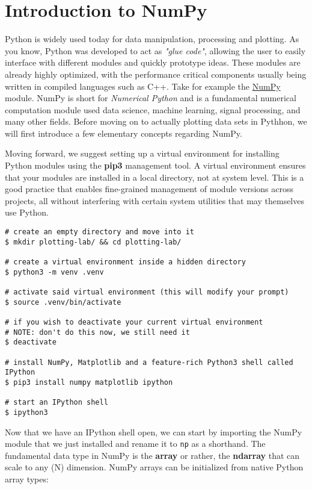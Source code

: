 \section{Introduction to NumPy}

Python is widely used today for data manipulation, processing and plotting. As
you know, Python was developed to act as \textit{"glue code"}, allowing the
user to easily interface with different modules and quickly prototype ideas.
These modules are already highly optimized, with the performance critical
components usually being written in compiled languages such as C++. Take for
example the \href{https://github.com/numpy/numpy}{NumPy} module. NumPy is
short for \textit{Numerical Python} and is a fundamental numerical computation
module used data science, machine learning, signal processing, and many other
fields. Before moving on to actually plotting data sets in Pythhon, we will
first introduce a few elementary concepts regarding NumPy.

Moving forward, we suggest setting up a virtual environment for installing
Python modules using the \textbf{pip3} management tool. A virtual environment
ensures that your modules are installed in a local directory, not at system
level. This is a good practice that enables fine-grained management of module
versions across projects, all without interfering with certain system utilities
that may themselves use Python.

\begin{lstlisting}[style=bashstyle]
# create an empty directory and move into it
$ mkdir plotting-lab/ && cd plotting-lab/

# create a virtual environment inside a hidden directory
$ python3 -m venv .venv

# activate said virtual environment (this will modify your prompt)
$ source .venv/bin/activate

# if you wish to deactivate your current virtual environment
# NOTE: don't do this now, we still need it
$ deactivate

# install NumPy, Matplotlib and a feature-rich Python3 shell called IPython
$ pip3 install numpy matplotlib ipython

# start an IPython shell
$ ipython3
\end{lstlisting}

Now that we have an IPython shell open, we can start by importing the NumPy
module that we just installed and rename it to \texttt{np} as a shorthand.
The fundamental data type in NumPy is the \textbf{array} or rather, the
\textbf{ndarray} that can scale to any (N) dimension. NumPy arrays can be
initialized from native Python array types:

